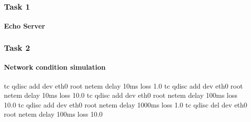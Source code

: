 \begin{frame}		
	\frametitle{Task 1}
	\framesubtitle{Echo Server}
	
	\begin{figure}[H]
	\end{figure}
	
\end{frame}

\begin{frame}[fragile]
	\frametitle{Task 2}
	\framesubtitle{Network condition simulation}
	
	
	\begin{semiverbatim}
		tc qdisc add dev eth0 root netem delay 10ms   loss 1.0%
		tc qdisc add dev eth0 root netem delay 10ms   loss 10.0%
		tc qdisc add dev eth0 root netem delay 100ms  loss 10.0%
		tc qdisc add dev eth0 root netem delay 1000ms loss 1.0%
		tc qdisc del dev eth0 root netem delay 100ms  loss 10.0%
	\end{semiverbatim}

\end{frame}


